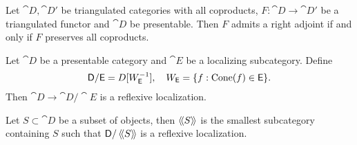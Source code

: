 \begin{theorem}
	Let $\cat{D},\cat{D}'$ be triangulated categories with all coproducts, $F:\cat{D}\to \cat{D}'$ be a triangulated functor and $\cat{D}$ be presentable. Then $F$ admits a right adjoint if and only if $F$ preserves all coproducts.
\end{theorem}
\begin{corollary}
	Let $\cat{D}$ be a presentable category and $\cat{E}$ be a localizing subcategory. Define
	\[
		\mathsf{D} / \mathsf{E} = D[W_{\mathsf{E}}^{-1}],\quad W_{\mathsf{E}} = \{f:\operatorname{Cone}(f)\in \mathsf{E}\} 
	.\] 
	Then $\cat{D} \to \cat{D} /\cat{E}$ is a reflexive localization.
\end{corollary}
Let $S\subset \cat{D}$ be a subset of objects, then $\left\langle\!\left\langle S \right\rangle\!\right\rangle$ is the smallest subcategory containing $S$ such that $\mathsf{D} /\left\langle\!\left\langle S \right\rangle\!\right\rangle$ is a reflexive localization.

